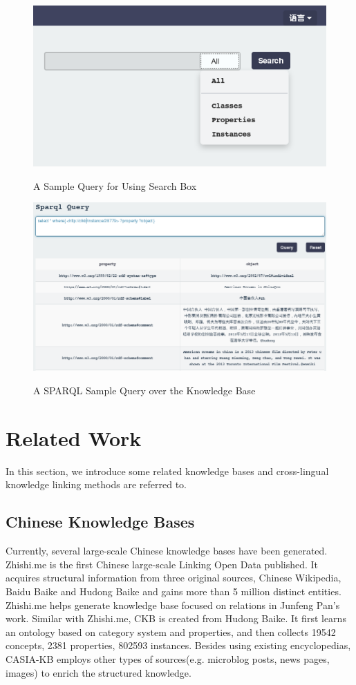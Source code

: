 \documentclass[runningheads,a4paper]{llncs}
\begin{document}
\begin{figure}
    \centering
    \begin{minipage}[t]{0.8\textwidth}
        \centerline{\includegraphics[width=0.8\columnwidth]{fig/search-engine}}
        \label{fig:search-engine}
        \caption{A Sample Query for Using Search Box }
    \end{minipage}%
    \begin{minipage}[t]{0.8\textwidth}
        \centerline{\includegraphics[width=0.8\columnwidth]{fig/sparql-endpoint}}
        \label{fig:sparql-endpoint}
        \caption{A SPARQL Sample Query over the Knowledge Base}
    \end{minipage}%
\end{figure}

\section{Related Work}
\label{sec:work}
In this section, we introduce some related knowledge bases and cross-lingual knowledge linking methods are referred to.
\subsection{Chinese Knowledge Bases}
Currently, several large-scale Chinese knowledge bases have been generated. Zhishi.me\cite{niu2011zhishi,wang2014publishing} is the first Chinese large-scale Linking Open Data published. It acquires structural information from three original sources, Chinese Wikipedia, Baidu Baike and Hudong Baike and gains more than 5 million distinct entities. Zhishi.me helps generate knowledge base focused on relations in Junfeng Pan’s work\cite{pan2012building}.
Similar with Zhishi.me, CKB\cite{wang2012building} is created from Hudong Baike. It first learns an ontology based on category system and properties, and then collects 19542 concepts, 2381 properties, 802593 instances. Besides using existing encyclopedias, CASIA-KB employs other types of sources(e.g. microblog posts, news pages, images) to enrich the structured knowledge.
\end{document}
